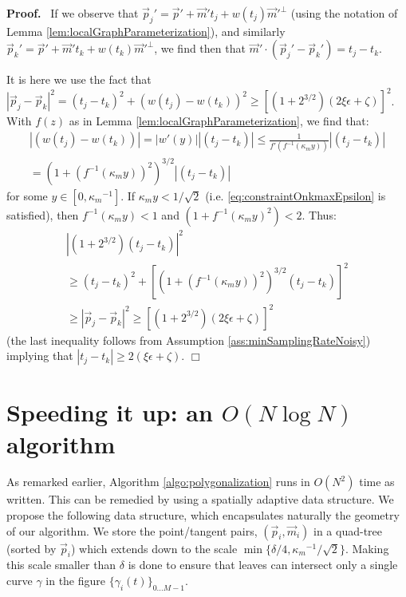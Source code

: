 \documentclass{article}
\newenvironment{proof}{
  \noindent\textbf{Proof.}\ }{\hspace*{\fill}
  \begin{math}\Box\end{math}\medskip}
\numberwithin{cntr}{section}
\numberwithin{equation}{section}
\newcommand{\abs}[1]{\left| #1 \right|}%
\newcommand{\vp}[0]{{\vec{p}}}
\newcommand{\vm}[0]{{\vec{m}}}
\newcommand{\Oto}[1]{{0 \ldots #1-1}}
\newcommand{\curveSet}{{ \{ \gamma_i(t) \}_{\Oto{M}}}}
\newcommand{\curvemax}{{\kappa_{m}}}
\newcommand{\curvemaxi}{{\curvemax^{-1}}}
\newcommand{\curvesep}{{\delta}}
\newcommand{\pointNoise}{{\zeta}}
\newcommand{\tanNoise}{{\xi}}
\begin{document}
\begin{proof}
If we observe that $\vp_{j}' = \vp' + \vm' t_{j} + w(t_{j}) \vm'^{\perp}$ (using the notation of Lemma \ref{lem:localGraphParameterization}), and similarly $\vp_{k}' = \vp' + \vm' t_{k} + w(t_{k}) \vm'^{\perp}$, we find then that $\vm' \cdot (\vp_{j}'-\vp_{k}') = t_{j}-t_{k}$.

It is here we use the fact that $\abs{\vp_{j} - \vp_{k}}^{2} = (t_{j}-t_{k})^{2} + (w(t_{j})-w(t_{k}))^{2} \geq [(1+2^{3/2})(2 \tanNoise \epsilon + \pointNoise)]^{2}$. With $f(z)$ as in Lemma \ref{lem:localGraphParameterization}, we find that:
\begin{multline*}
  \abs{(w(t_{j})-w(t_{k}))} = \abs{w'(y)}\abs{(t_{j}-t_{k})} \leq \frac{1}{f'(f^{-1}(\curvemax y))} \abs{(t_{j}-t_{k})} \\
  = (1+(f^{-1}(\curvemax y))^{2})^{3/2} \abs{(t_{j}-t_{k} )}
\end{multline*}
for some $y \in [0,\curvemaxi]$. If $\curvemax y < 1/\sqrt{2}$ (i.e. \eqref{eq:constraintOnkmaxEpsilon} is satisfied), then $f^{-1}(\curvemax y) < 1$ and $(1+f^{-1}(\curvemax y)^{2}) < 2$. Thus:
\begin{multline}
  \abs{(1+2^{3/2})(t_{j}-t_{k})}^{2} \\
  \geq (t_{j}-t_{k})^{2} + [(1+(f^{-1}(\curvemax y))^{2})^{3/2} (t_{j}-t_{k} )]^{2} \\
  \geq \abs{\vp_{j} - \vp_{k}}^{2}  \geq [(1+2^{3/2})(2 \tanNoise \epsilon + \pointNoise)]^{2}
\end{multline}
(the last inequality follows from Assumption \ref{ass:minSamplingRateNoisy}) implying that $\abs{t_{j}-t_{k}} \geq 2(\tanNoise \epsilon + \pointNoise)$.
\end{proof}


\section{Speeding it up: an $O(N \log N)$ algorithm}
\label{sec:quadTreeSection}

As remarked earlier, Algorithm \ref{algo:polygonalization} runs in $O(N^{2})$ time as written. This can be remedied by using a spatially adaptive data structure. We propose the following data structure, which encapsulates naturally the geometry of our algorithm. We store the point/tangent pairs, $(\vp_{i},\vm_{i})$ in a quad-tree (sorted by $\vp_{i}$) which extends down to the scale $\min\{ \curvesep / 4, \curvemaxi / \sqrt{2} \}$. Making this scale smaller than $\delta$ is done to ensure that leaves can intersect only a single curve $\gamma$ in the figure $\curveSet$.
\end{document}
